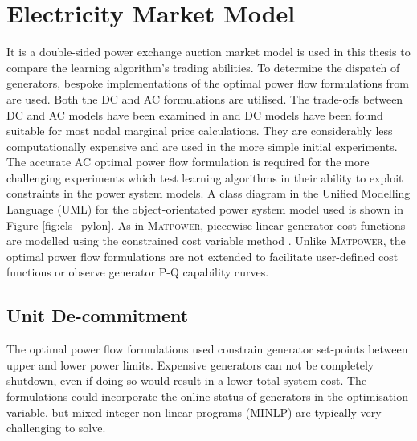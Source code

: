 \section{Electricity Market Model}
It is a double-sided power exchange auction market model is used in this
thesis to compare the learning algorithm's trading abilities.  To determine the
dispatch of generators, bespoke implementations of the optimal power flow
formulations from \matpower \cite[\S5]{pserc:mp_manual} are used.  Both the DC
and AC formulations are utilised. The trade-offs between DC and AC models have
been examined in  and DC models have been found suitable
for most nodal marginal price calculations.  They are considerably less
computationally expensive and are used in the more simple initial experiments.
The accurate AC optimal power flow formulation is required for the more
challenging experiments which test learning algorithms in their ability to
exploit constraints in the power system models.  A class diagram in the
Unified Modelling Language (UML) for the object-orientated power system model
used is shown in Figure \ref{fig:cls_pylon}.  As in \textsc{Matpower},
piecewise linear generator cost functions are modelled using the constrained cost variable
method \cite{zimmerman:ccv}.  Unlike \textsc{Matpower}, the optimal power flow
formulations are not extended to facilitate user-defined cost functions or
observe generator P-Q capability curves.

%

\subsection{Unit De-commitment}
The optimal power flow formulations used constrain generator set-points
between upper and lower power limits.  Expensive generators can not be
completely shutdown, even if doing so would result in a lower total system
cost.  The formulations could incorporate the online status of generators in
the optimisation variable, but mixed-integer non-linear programs (MINLP) are
typically very challenging to solve.

